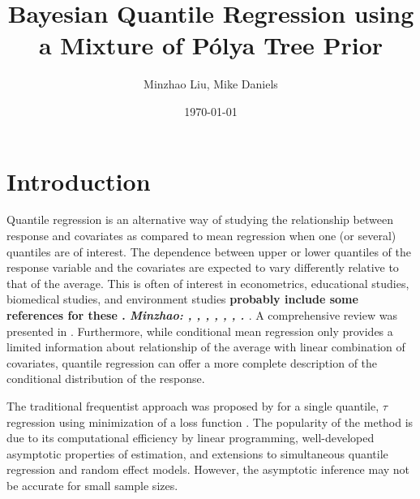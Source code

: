 \documentclass[12pt]{article}
\title{Bayesian Quantile Regression using a  Mixture of P\'{o}lya Tree Prior}
\date{\today}
\author{Minzhao Liu, Mike Daniels}
\begin{document}

\maketitle{}

\section{Introduction}

Quantile regression is an alternative way of studying the relationship
between response and covariates as compared to mean
regression when one (or several)
quantiles are of interest.  The dependence
between upper or lower quantiles of the response variable and the
covariates are expected to vary differently relative to that of the
average. This is often of interest in econometrics,
educational studies, biomedical studies, and environment
studies {\bf probably include some references for these .  {\it
    Minzhao: \citet{yu2001}, \citet{buchinsky1994},
    \citet{buchinsky1998}, \citet{he1998}, \citet{koenker1999},
    \citet{wei2006}, \citet{yu2003}. }
}.   
A comprehensive review was presented in \citet{koenker2005}.  
Furthermore, while conditional mean regression only provides a
limited information about relationship of the average with linear
combination of covariates,  quantile regression can offer a more
complete description of the conditional distribution of the response. 

The traditional frequentist approach was proposed by
\citet{koenker1978} for a single quantile, $\tau$ regression using 
minimization of a loss function \citet{koenker1978}. The
popularity of the method is due 
to its computational efficiency by linear programming, well-developed
asymptotic properties of estimation, and extensions to
simultaneous quantile regression and random effect models. However,
the asymptotic inference may not be accurate  for small sample
sizes. 
 
\end{document}
